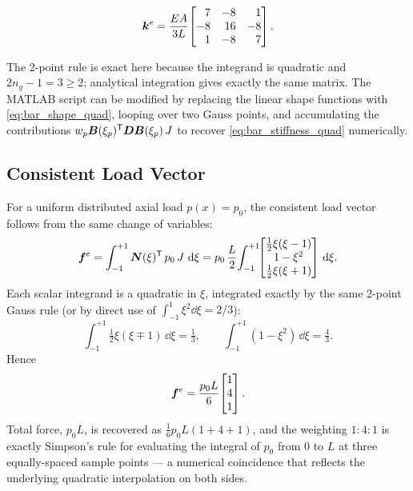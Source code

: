 \begin{importantbox}
\begin{equation}
    \matr{k}^e = \frac{EA}{3L}\!
    \begin{bmatrix*}[r]
        7 & -8 &  1 \\
       -8 & 16 & -8 \\
        1 & -8 &  7
    \end{bmatrix*} .
    \label{eq:bar_stiffness_quad}
\end{equation}
\end{importantbox}

\noindent The 2-point rule is exact here because the integrand is
quadratic and $2n_g - 1 = 3 \geq 2$; analytical integration gives
exactly the same matrix. The MATLAB script  can be
modified by replacing the linear shape functions with
\cref{eq:bar_shape_quad}, looping over two Gauss points, and accumulating
the contributions $w_p \bm{B}(\xi_p)^{\mathsf{T}}\bm{D}\bm{B}(\xi_p)\,J$
to recover \cref{eq:bar_stiffness_quad} numerically.

\subsection{Consistent Load Vector}

For a uniform distributed axial load $p(x) = p_0$, the consistent load
vector follows from the same change of variables:
\begin{equation}
    \bm{f}^e
    = \int_{-1}^{+1} \bm{N}(\xi)^{\mathsf{T}}\,p_0\,J\,\,\mathrm{d}\xi
    = p_0\,\frac{L}{2}\!\int_{-1}^{+1}\!\!
      \begin{bmatrix} \tfrac{1}{2}\xi(\xi-1) \\ 1-\xi^2 \\
                      \tfrac{1}{2}\xi(\xi+1) \end{bmatrix} \,\mathrm{d}\xi .
\end{equation}
Each scalar integrand is a quadratic in $\xi$, integrated exactly by the
same 2-point Gauss rule (or by direct use of $\int_{-1}^{1}\xi^2\dd\xi = 2/3$):
\[
    \int_{-1}^{+1}\!\!\tfrac{1}{2}\xi(\xi\mp 1)\,\dd\xi = \tfrac{1}{3},
    \qquad
    \int_{-1}^{+1}\!\!(1-\xi^2)\,\dd\xi = \tfrac{4}{3} .
\]
Hence
\begin{equation}
    \bm{f}^e = \frac{p_0 L}{6}\!
    \begin{bmatrix} 1 \\ 4 \\ 1 \end{bmatrix} .
    \label{eq:bar_load_quad}
\end{equation}
Total force, $p_0 L$, is recovered as $\tfrac{1}{6}p_0 L (1+4+1)$, and the
weighting $1{:}4{:}1$ is exactly Simpson's rule for evaluating the
integral of $p_0$ from $0$ to $L$ at three equally-spaced sample points
--- a numerical coincidence that reflects the underlying quadratic
interpolation on both sides.

